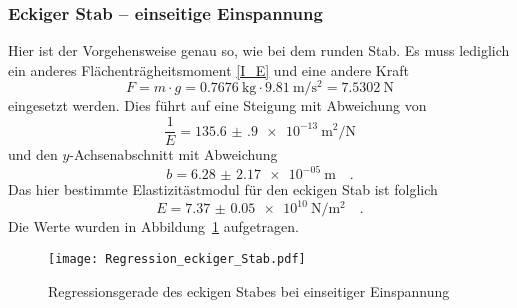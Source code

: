 \subsubsection{Eckiger Stab -- einseitige Einspannung}
Hier ist der Vorgehensweise genau so, wie bei dem runden Stab. Es muss lediglich ein anderes Flächenträgheitsmoment \ref{I_E} und eine andere Kraft
\begin{equation}
  F = m \cdot g = \SI{0.7676}{\kilo\gram} \cdot \SI{9.81}{\metre\per\second\squared} = \SI{7.5302}{\newton}
\end{equation}
eingesetzt werden.
Dies führt auf eine Steigung mit Abweichung von
\begin{equation}
  \frac{1}{E}= \SI{135.6(9)e-13}{\metre\squared\per\newton}
\end{equation}
und den $y$-Achsenabschnitt mit Abweichung
\begin{equation}
  b = \SI{6.28(217)e-05}{\metre} \quad.
\end{equation}
Das hier bestimmte Elastizitästmodul für den eckigen Stab ist folglich
\begin{equation}
  E = \SI{7.37(5)e+10}{\newton\per\metre\squared} \quad.
\end{equation}
Die Werte wurden in Abbildung~\ref{fig:Regression_eckiger_Stab} aufgetragen.

\begin{figure}[h!]
\centering
\texttt{[image: Regression\_eckiger\_Stab.pdf]}
\caption{Regressionsgerade des eckigen Stabes bei einseitiger Einspannung}
\label{fig:Regression_eckiger_Stab}
\end{figure}







